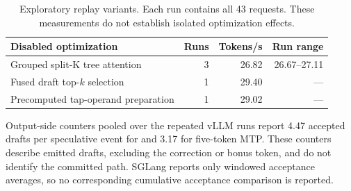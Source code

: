 \begin{table}[t]
\caption{Exploratory replay variants. Each run contains all 43 requests. These measurements do not establish isolated optimization effects.}
\label{tab:replay-variants}
\centering\small
\setlength{\tabcolsep}{3pt}
\begin{tabular}{@{}lrrr@{}}
\toprule
Disabled optimization & Runs & Tokens/s & Run range \\
\midrule
Grouped split-K tree attention & 3 & 26.82 & 26.67--27.11 \\
Fused draft top-$k$ selection & 1 & 29.40 & --- \\
Precomputed tap-operand preparation & 1 & 29.02 & --- \\
\bottomrule
\end{tabular}
\end{table}

Output-side counters pooled over the repeated vLLM runs report 4.47 accepted drafts per speculative event for \sys{} and 3.17 for five-token MTP. These counters describe emitted drafts, excluding the correction or bonus token, and do not identify the committed path. SGLang reports only windowed acceptance averages, so no corresponding cumulative acceptance comparison is reported.
